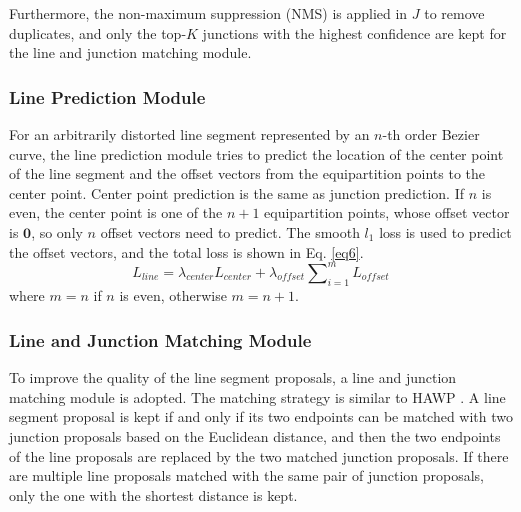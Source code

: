 \documentclass[letterpaper, 10 pt, conference]{ieeeconf}
\begin{document}
Furthermore, the non-maximum suppression (NMS) is applied in $J$ to remove duplicates, and only the top-$K$ junctions with the highest confidence are kept for the line and junction matching module.

\subsubsection{\textbf{Line Prediction Module}} \label{sec3-4-2}
For an arbitrarily distorted line segment represented by an $n$-th order Bezier curve, the line prediction module tries to predict the location of the center point of the line segment and the offset vectors from the equipartition points to the center point. Center point prediction is the same as junction prediction. If $n$ is even, the center point is one of the $n+1$ equipartition points, whose offset vector is $\boldsymbol{0}$, so only $n$ offset vectors need to predict. The smooth $l_1$ loss is used to predict the offset vectors, and the total loss is shown in Eq. \ref{eq6}.
\begin{equation} \label{eq6}
	L_{line}=\lambda_{center} L_{center}+\lambda_{offset} \sum \nolimits_{i=1}^{m} L_{offset}
\end{equation}
where $m=n$ if $n$ is even, otherwise $m=n+1$.

\subsubsection{\textbf{Line and Junction Matching Module}} \label{sec3-4-3}
To improve the quality of the line segment proposals, a line and junction matching module is adopted. The matching strategy is similar to HAWP \cite{HAWP}. A line segment proposal is kept if and only if its two endpoints can be matched with two junction proposals based on the Euclidean distance, and then the two endpoints of the line proposals are replaced by the two matched junction proposals. If there are multiple line proposals matched with the same pair of junction proposals, only the one with the shortest distance is kept.
\end{document}

